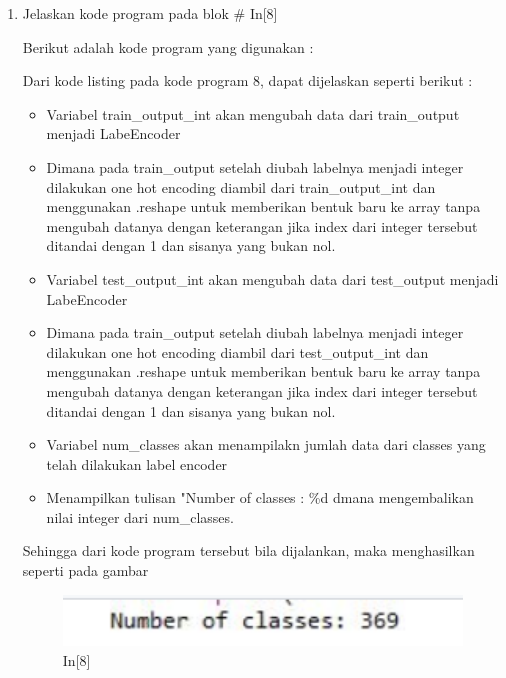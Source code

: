 \begin{enumerate}
\begin{figure}[!htbp]
\end{figure}
\item Jelaskan kode program pada blok \# In[8]
\par Berikut adalah kode program yang digunakan :

\par Dari kode listing pada kode program 8, dapat dijelaskan seperti berikut :
\begin{itemize}
\item Variabel train\_output\_int  akan mengubah data dari train\_output menjadi LabeEncoder
\item Dimana pada train\_output setelah diubah labelnya menjadi integer dilakukan one hot encoding diambil dari train\_output\_int dan menggunakan .reshape untuk memberikan bentuk baru ke array tanpa mengubah datanya dengan keterangan jika index dari integer tersebut ditandai dengan 1 dan sisanya yang bukan nol.
\item Variabel test\_output\_int  akan mengubah data dari test\_output menjadi LabeEncoder
\item Dimana pada train\_output setelah diubah labelnya menjadi integer dilakukan one hot encoding diambil dari test\_output\_int dan menggunakan .reshape untuk memberikan bentuk baru ke array tanpa mengubah datanya dengan keterangan jika index dari integer tersebut ditandai dengan 1 dan sisanya yang bukan nol.
\item Variabel num\_classes akan menampilakn jumlah data dari classes yang telah dilakukan label encoder
\item Menampilkan tulisan "Number of classes : \%d dmana mengembalikan nilai integer dari num\_classes.
\end{itemize}
\par Sehingga dari kode program tersebut bila dijalankan, maka menghasilkan seperti pada gambar 
\begin{figure}[!htbp]
	\centerline{\includegraphics[width=1\textwidth]{figures/andi/p8.PNG}}
	\caption{In[8]}
	

\end{figure}
\end{enumerate}
